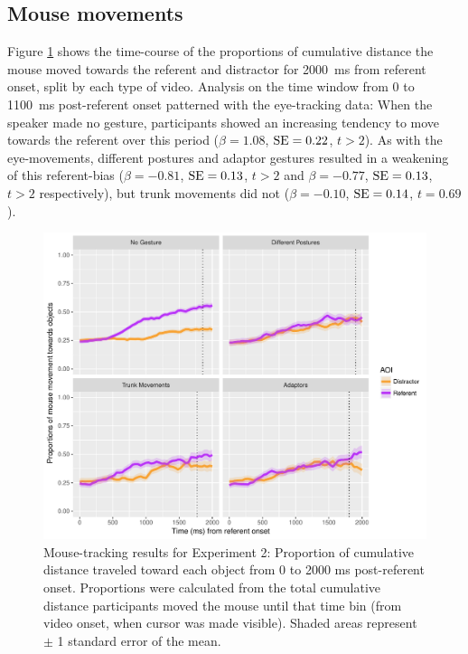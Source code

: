 \documentclass[a4paper,man,natbib]{apa6}
\newcommand{\resultsLM}[3]{$\beta = #1$, $\textnormal{SE} = #2$, $t #3$}
\begin{document}
\subsection{Mouse movements}
Figure \ref{fig:v1_mouse} shows the time-course of the proportions of cumulative distance the mouse moved towards the referent and distractor for 2000~ms from referent onset, split by each type of video.
Analysis on the time window from 0 to 1100~ms post-referent onset patterned with the eye-tracking data:
When the speaker made no gesture, participants showed an increasing tendency to move towards the referent over this period (\resultsLM{1.08}{0.22}{>2}).
As with the eye-movements, different postures and adaptor gestures resulted in a weakening of this referent-bias (\resultsLM{-0.81}{0.13}{>2} and \resultsLM{-0.77}{0.13}{>2} respectively), but trunk movements did not (\resultsLM{-0.10}{0.14}{=0.69}). 

\begin{figure}[Ht]
  \centering
	\includegraphics[width=\linewidth]{./img/e7_mouset.pdf}
  \caption{Mouse-tracking results for Experiment 2: Proportion of cumulative distance traveled toward each object from 0 to 2000 ms post-referent onset. Proportions were calculated from the total cumulative distance participants moved the mouse until that time bin (from video onset, when cursor was made visible). Shaded areas represent $\pm$ 1 standard error of the mean.}
  \label{fig:v1_mouse}
\end{figure}
\end{document}
